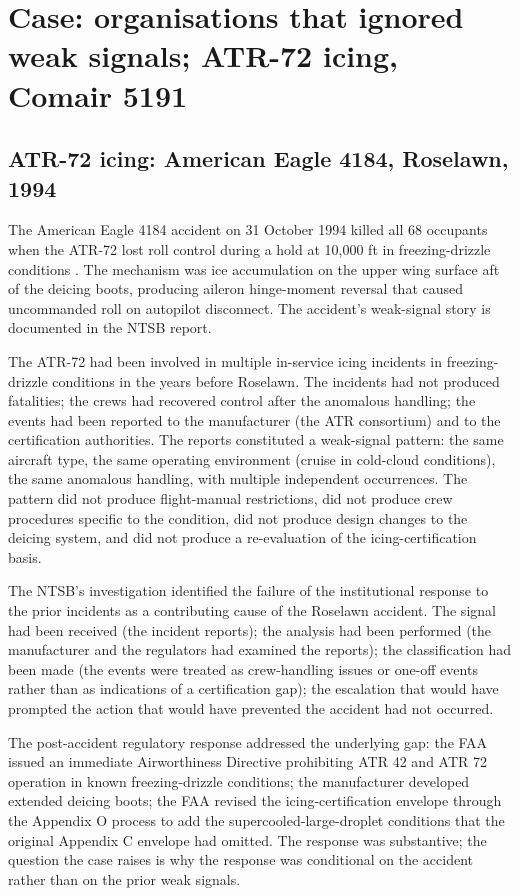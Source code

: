 \section{Case: organisations that ignored weak signals; ATR-72 icing, Comair 5191}

\subsection*{ATR-72 icing: American Eagle 4184, Roselawn, 1994}

The American Eagle 4184 accident on 31 October 1994 killed all 68 occupants when the ATR-72 lost roll control during a hold at 10,000 ft in freezing-drizzle conditions \cite{acc:ntsb-aar96-01}. The mechanism was ice accumulation on the upper wing surface aft of the deicing boots, producing aileron hinge-moment reversal that caused uncommanded roll on autopilot disconnect. The accident's weak-signal story is documented in the NTSB report.

The ATR-72 had been involved in multiple in-service icing incidents in freezing-drizzle conditions in the years before Roselawn. The incidents had not produced fatalities; the crews had recovered control after the anomalous handling; the events had been reported to the manufacturer (the ATR consortium) and to the certification authorities. The reports constituted a weak-signal pattern: the same aircraft type, the same operating environment (cruise in cold-cloud conditions), the same anomalous handling, with multiple independent occurrences. The pattern did not produce flight-manual restrictions, did not produce crew procedures specific to the condition, did not produce design changes to the deicing system, and did not produce a re-evaluation of the icing-certification basis.

The NTSB's investigation identified the failure of the institutional response to the prior incidents as a contributing cause of the Roselawn accident. The signal had been received (the incident reports); the analysis had been performed (the manufacturer and the regulators had examined the reports); the classification had been made (the events were treated as crew-handling issues or one-off events rather than as indications of a certification gap); the escalation that would have prompted the action that would have prevented the accident had not occurred.

The post-accident regulatory response addressed the underlying gap: the FAA issued an immediate Airworthiness Directive prohibiting ATR 42 and ATR 72 operation in known freezing-drizzle conditions; the manufacturer developed extended deicing boots; the FAA revised the icing-certification envelope through the Appendix O process to add the supercooled-large-droplet conditions that the original Appendix C envelope had omitted. The response was substantive; the question the case raises is why the response was conditional on the accident rather than on the prior weak signals.


